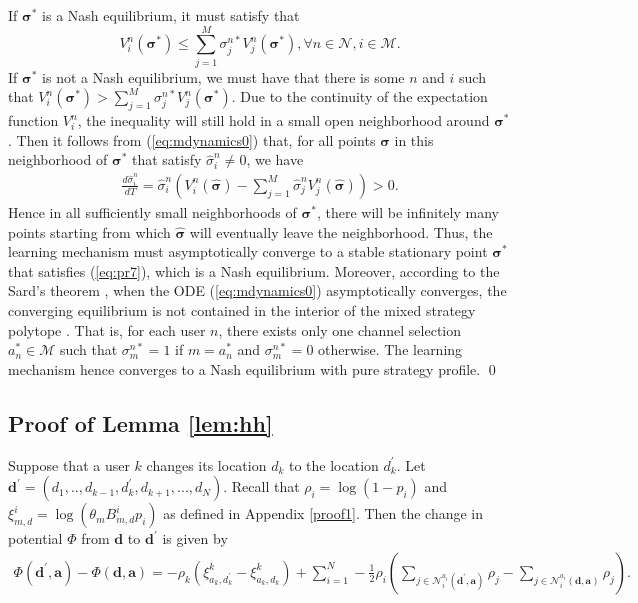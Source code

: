 If $\boldsymbol{\sigma}^{*}$ is a Nash equilibrium, it must satisfy
that\begin{equation}
V_{i}^{n}(\boldsymbol{\sigma}^{*})\leq\sum_{j=1}^{M}\sigma_{j}^{n*}V_{j}^{n}(\boldsymbol{\sigma}^{*}),\forall n\in\mathcal{N},i\in\mathcal{M}.\label{eq:pr7}\end{equation}
If $\boldsymbol{\sigma}^{*}$ is not a Nash equilibrium, we must have
that there is some $n$ and $i$ such that $V_{i}^{n}(\boldsymbol{\sigma}^{*})>\sum_{j=1}^{M}\sigma_{j}^{n*}V_{j}^{n}(\boldsymbol{\sigma}^{*}).$
Due to the continuity of the expectation function $V_{i}^{n}$, the
inequality will still hold in a small open neighborhood around $\boldsymbol{\sigma}^{*}$.
Then it follows from (\ref{eq:mdynamics0}) that, for all points $\hat{\boldsymbol{\sigma}}$
in this neighborhood of $\boldsymbol{\sigma}^{*}$ that satisfy $\hat{\sigma}_{i}^{n}\neq0$,
we have \begin{align*}
\frac{d\hat{\sigma}_{i}^{n}}{dT}  = \hat{\sigma}_{i}^{n}(V_{i}^{n}(\hat{\boldsymbol{\sigma}})-\sum_{j=1}^{M}\hat{\sigma}_{j}^{n}V_{j}^{n}(\hat{\boldsymbol{\sigma}})) > 0.\end{align*}
Hence in all sufficiently small neighborhoods of $\boldsymbol{\sigma}^{*}$,
there will be infinitely many points starting from which $\hat{\boldsymbol{\sigma}}$
will eventually leave the neighborhood. Thus, the learning mechanism must asymptotically converge to a stable stationary
point $\boldsymbol{\sigma}^{*}$ that satisfies (\ref{eq:pr7}), which is a Nash equilibrium. Moreover, according to the Sard's theorem \cite{schoen1994lectures}, when the ODE (\ref{eq:mdynamics0}) asymptotically converges, the converging equilibrium is not contained in the interior of the mixed strategy polytope \cite{kleinberg2009multiplicative}. That is, for each user $n$, there exists only one channel selection $a_{n}^{*}\in\mathcal{M}$ such that $\sigma_{m}^{n*}=1$ if $m=a_{n}^{*}$ and $\sigma_{m}^{n*}=0$ otherwise.  The learning mechanism hence converges to a Nash equilibrium with pure strategy profile. \qed

\subsection{Proof of Lemma \ref{lem:hh}}\label{proof2}
Suppose that a user $k$ changes its location $d_{k}$ to the location
$d_{k}^{'}$. Let $\boldsymbol{d}^{'}=(d_{1},..,d_{k-1},d_{k}^{'},d_{k+1},...,d_{N})$.
Recall that $\rho_{i}=\log(1-p_{i})$ and $\xi_{m,d}^{i}=\log(\theta_{m}B_{m,d}^{i}p_{i})$  as defined in Appendix \ref{proof1}.
Then the change in potential $\Phi$ from $\boldsymbol{d}$ to $\boldsymbol{d}^{'}$ is given
by\begin{align}
\Phi(\boldsymbol{d}^{'},\boldsymbol{a})-\Phi(\boldsymbol{d},\boldsymbol{a})= -\rho_{k}(\xi_{a_{k},d_{k}^{'}}^{k}-\xi_{a_{k},d_{k}}^{k})+\sum_{i=1}^{N}-\frac{1}{2}\rho_{i}\left(\sum_{j\in\mathcal{N}_{i}^{a_{i}}(\boldsymbol{d}^{'},\boldsymbol{a})}\rho_{j}-\sum_{j\in\mathcal{N}_{i}^{a_{i}}(\boldsymbol{d},\boldsymbol{a})}\rho_{j}\right).\label{eq:sm0}\end{align}


